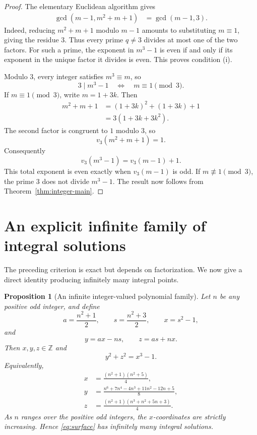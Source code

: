 \documentclass[11pt,a4paper]{article}
\numberwithin{equation}{section}
\newtheorem{proposition}[theorem]{Proposition}
\theoremstyle{definition}
\theoremstyle{remark}
\newcommand{\Z}{\mathbb Z}
\newcommand{\divides}{\mathrel{|}}
\begin{document}
\begin{proof}
The elementary Euclidean algorithm gives
\begin{align}
 \gcd(m-1,m^2+m+1)
 &=\gcd(m-1,3).
 \label{eq:gcd-factors}
\end{align}
Indeed, reducing $m^2+m+1$ modulo $m-1$ amounts to substituting $m\equiv1$, giving the residue $3$. Thus every prime $q\neq3$ divides at most one of the two factors. For such a prime, the exponent in $m^3-1$ is even if and only if its exponent in the unique factor it divides is even. This proves condition (i).

Modulo $3$, every integer satisfies $m^3\equiv m$, so
\[
 3\divides m^3-1
 \quad\Longleftrightarrow\quad
 m\equiv1\pmod3.
\]
If $m\equiv1\pmod3$, write $m=1+3k$. Then
\begin{align*}
 m^2+m+1
 &=(1+3k)^2+(1+3k)+1\\
 &=3(1+3k+3k^2).
\end{align*}
The second factor is congruent to $1$ modulo $3$, so
\begin{equation}
 v_3(m^2+m+1)=1.
 \label{eq:v3-cyclotomic-factor}
\end{equation}
Consequently
\begin{equation}
 v_3(m^3-1)=v_3(m-1)+1.
 \label{eq:v3-total}
\end{equation}
This total exponent is even exactly when $v_3(m-1)$ is odd. If $m\not\equiv1\pmod3$, the prime $3$ does not divide $m^3-1$. The result now follows from Theorem~\ref{thm:integer-main}.
\end{proof}

\section{An explicit infinite family of integral solutions}
\label{sec:infinite-family}

The preceding criterion is exact but depends on factorization. We now give a direct identity producing infinitely many integral points.

\begin{proposition}[An infinite integer-valued polynomial family]
\label{prop:infinite-family}
Let $n$ be any positive odd integer, and define
\begin{equation}
 a=\frac{n^2+1}{2},
 \qquad
 s=\frac{n^2+3}{2},
 \qquad
 x=s^2-1,
 \label{eq:family-asx}
\end{equation}
and
\begin{equation}
 y=ax-ns,
 \qquad
 z=as+nx.
 \label{eq:family-yz}
\end{equation}
Then $x,y,z\in\Z$ and
\[
 y^2+z^2=x^3-1.
\]
Equivalently,
\begin{align}
 x&=\frac{(n^2+1)(n^2+5)}4,
 \label{eq:family-x-expanded}\\
 y&=\frac{n^6+7n^4-4n^3+11n^2-12n+5}{8},
 \label{eq:family-y-expanded}\\
 z&=\frac{(n^2+1)(n^3+n^2+5n+3)}4.
 \label{eq:family-z-expanded}
\end{align}
As $n$ ranges over the positive odd integers, the $x$-coordinates are strictly increasing. Hence \eqref{eq:surface} has infinitely many integral solutions.
\end{proposition}
\end{document}

